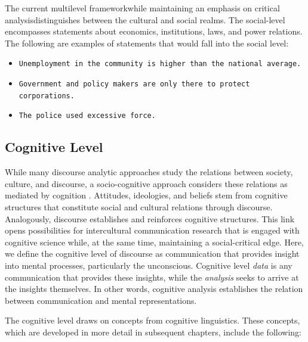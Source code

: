The current multilevel framework\textemdash while maintaining an emphasis on critical analysis\textemdash distinguishes between the cultural and social realms. The social-level encompasses statements about economics, institutions, laws, and power relations. The following are examples of statements that would fall into the social level:     

\begin{footnotesize}
\begin{itemize}
    \item[-] \texttt{Unemployment in the community is higher than the national average.}
    \item[-] \texttt{Government and policy makers are only there to protect corporations.}
    \item[-] \texttt{The police used excessive force.}
\end{itemize}
\end{footnotesize}



\subsection{Cognitive Level} 

While many discourse analytic approaches study the relations between society, culture, and discourse, a socio-cognitive approach considers these relations as mediated by cognition \citep[64]{VanDijk2015a}. Attitudes, ideologies, and beliefs stem from cognitive structures that constitute social and cultural relations through discourse. Analogously, discourse establishes and reinforces cognitive structures. This link opens possibilities for intercultural communication research that is engaged with cognitive science while, at the same time, maintaining a social-critical edge. Here, we define the cognitive level of discourse as communication that provides insight into mental processes, particularly the unconscious. Cognitive level \textit{data} is any communication that provides these insights, while the \textit{analysis} seeks to arrive at the insights themselves. In other words, cognitive analysis establishes the relation between communication and mental representations. 

The cognitive level draws on concepts from cognitive linguistics. These concepts, which are developed in more detail in subsequent chapters, include the following:

